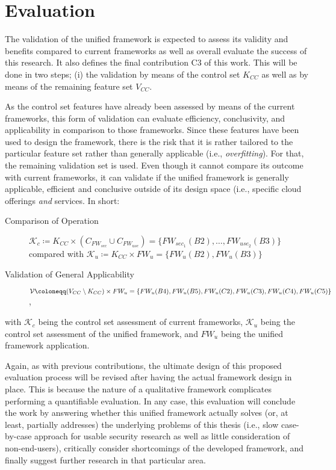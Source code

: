 \chapter{Evaluation}
\label{ch:evaluation}

The validation of the unified framework is expected to assess its validity and benefits compared to current frameworks as well as overall evaluate the success of this research. It also defines the final contribution C3 of this work. This will be done in two steps; (i) the validation by means of the control set $K_{CC}$ as well as by means of the remaining feature set $V_{CC}$.

As the control set features have already been assessed by means of the current frameworks, this form of validation can evaluate efficiency, conclusivity, and applicability in comparison to those frameworks. Since these features have been used to design the framework, there is the risk that it is rather tailored to the particular feature set rather than generally applicable (i.e., \textit{overfitting}). For that, the remaining validation set is used. Even though it cannot compare its outcome with current frameworks, it can validate if the unified framework is generally applicable, efficient and conclusive outside of its design space (i.e., specific cloud offerings \textit{and} services. In short:

\begin{description}
	\item[Comparison of Operation] $\mathcal{K}_c \coloneqq K_{CC} \times (C_{FW_{sec}} \cup C_{FW_{use}}) = \{FW_{sec_1}(B2), \dots, FW_{use_2}(B3)\}$ compared with $\mathcal{K}_u \coloneqq K_{CC} \times FW_u = \{FW_u(B2), FW_u(B3)\}$
	\item[Validation of General Applicability] $\mathcal{V} \coloneqq (V_{CC} \setminus K_{CC}) \times FW_u = \{FW_u(B4), FW_u(B5), FW_u(C2),\\ FW_u(C3), FW_u(C4), FW_u(C5)\}$,
\end{description}

with $\mathcal{K}_c$ being the control set assessment of current frameworks, $\mathcal{K}_u$ being the control set assessment of the unified framework, and $FW_u$ being the unified framework application. 

Again, as with previous contributions, the ultimate design of this proposed evaluation process will be revised after having the actual framework design in place. This is because the nature of a qualitative framework complicates performing a quantifiable evaluation. In any case, this evaluation will conclude the work by answering whether this unified framework actually solves (or, at least, partially addresses) the underlying problems of this thesis (i.e., slow case-by-case approach for usable security research as well as little consideration of non-end-users), critically consider shortcomings of the developed framework, and finally suggest further research in that particular area.
